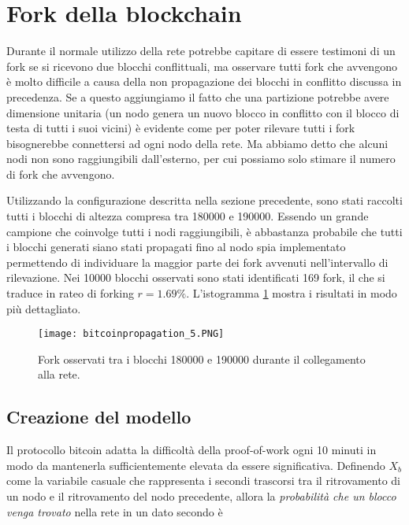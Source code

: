 \section{Fork della blockchain}\label{fork-della-blockchain}

Durante il normale utilizzo della rete potrebbe capitare di essere
testimoni di un fork se si ricevono due blocchi conflittuali, ma
osservare tutti fork che avvengono è molto difficile a causa della non
propagazione dei blocchi in conflitto discussa in precedenza. Se a
questo aggiungiamo il fatto che una partizione potrebbe avere dimensione
unitaria (un nodo genera un nuovo blocco in conflitto con il blocco di
testa di tutti i suoi vicini) è evidente come per poter rilevare tutti i
fork bisognerebbe connettersi ad ogni nodo della rete. Ma abbiamo detto
che alcuni nodi non sono raggiungibili dall'esterno, per cui possiamo
solo stimare il numero di fork che avvengono.

Utilizzando la configurazione descritta nella sezione precedente, sono
stati raccolti tutti i blocchi di altezza compresa tra 180000 e 190000.
Essendo un grande campione che coinvolge tutti i nodi raggiungibili, è
abbastanza probabile che tutti i blocchi generati siano stati propagati
fino al nodo spia implementato permettendo di individuare la maggior
parte dei fork avvenuti nell'intervallo di rilevazione. Nei 10000
blocchi osservati sono stati identificati 169 fork, il che si traduce in
rateo di forking $r = 1.69\%$. L'istogramma \ref{bitcoinpropagation_5}
mostra i risultati in modo più dettagliato.

\begin{figure}[htbp]
\centering
\texttt{[image: bitcoinpropagation\_5.PNG]}
\caption{Fork osservati tra i blocchi 180000 e 190000 durante il
collegamento alla rete.\label{bitcoinpropagation_5}}
\end{figure}

\subsection{Creazione del modello}\label{creazione-del-modello}

Il protocollo bitcoin adatta la difficoltà della proof-of-work ogni 10
minuti in modo da mantenerla sufficientemente elevata da essere
significativa. Definendo $X_b$ come la variabile casuale che rappresenta
i secondi trascorsi tra il ritrovamento di un nodo e il ritrovamento del
nodo precedente, allora la \emph{probabilità che un blocco venga
trovato} nella rete in un dato secondo è

